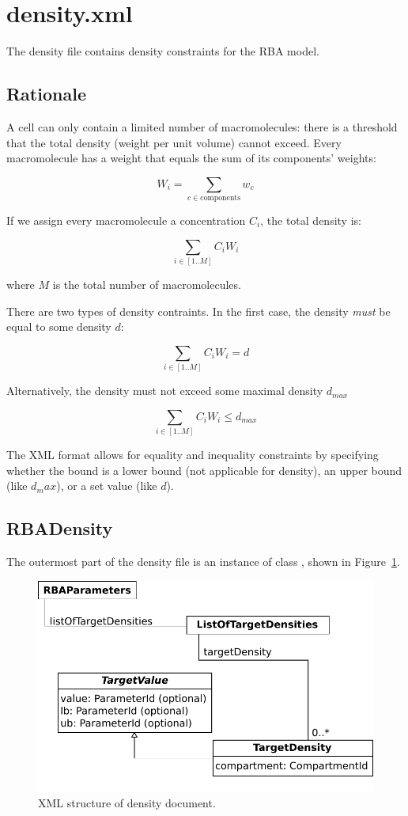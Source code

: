 
\section{density.xml}

The density file contains density constraints for the RBA model.

\subsection{Rationale}

A cell can only contain a limited number of macromolecules:
there is a threshold that the total density
(weight per unit volume) cannot exceed.
Every macromolecule has a weight that equals the sum of its components' weights:

\[
  W_i = \sum_{c \in \mathrm{components}} w_c
\]

If we assign every macromolecule a concentration $C_i$, the total density is:

\[
  \sum_{i \in [1..M]} C_i W_i
\]

where $M$ is the total number of macromolecules.

There are two types of density contraints.
In the first case, the density \emph{must} be equal to some density $d$:

\[
  \sum_{i \in [1..M]} C_i W_i = d
\]

Alternatively, the density must not exceed some maximal density $d_{max}$

\[
  \sum_{i \in [1..M]} C_i W_i \leq d_{max}
\]

The XML format allows for equality and inequality constraints by specifying
whether the bound is a lower bound (not applicable for density),
an upper bound (like $d_max$), or a set value (like $d$).

\subsection{RBADensity}
\label{sec:rba_density}

The outermost part of the density file is an instance of class
\rbadensity, shown in Figure~\ref{fig:density_doc}.

\begin{figure}
  \centering
  \includegraphics[scale=0.8]{figures/density_doc}
  \caption{XML structure of density document.}
\label{fig:density_doc}
\end{figure}

